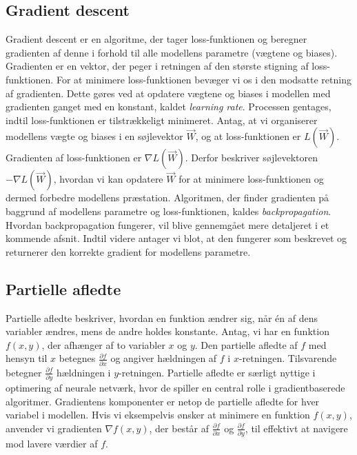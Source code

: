 \documentclass{article}
\begin{document}
\subsection{Gradient descent}
Gradient descent er en algoritme, der tager loss-funktionen og beregner gradienten af denne i forhold til alle modellens parametre (vægtene og biases). Gradienten er en vektor, der peger i retningen af den største stigning af loss-funktionen. For at minimere loss-funktionen bevæger vi os i den modsatte retning af gradienten. Dette gøres ved at opdatere vægtene og biases i modellen med gradienten ganget med en konstant, kaldet \textit{learning rate}. Processen gentages, indtil loss-funktionen er tilstrækkeligt minimeret. \parencite{IBM_2021, Sanderson_2017, Nielsen_2019a} Antag, at vi organiserer modellens vægte og biases i en søjlevektor $\vec{W}$, og at loss-funktionen er $L(\vec{W})$. Gradienten af loss-funktionen er $\nabla L(\vec{W})$. Derfor beskriver søjlevektoren $-\nabla L(\vec{W})$, hvordan vi kan opdatere $\vec{W}$ for at minimere loss-funktionen og dermed forbedre modellens præstation. Algoritmen, der finder gradienten på baggrund af modellens parametre og loss-funktionen, kaldes \textit{backpropagation}. \parencite{Sanderson_2017, Nielsen_2019a} Hvordan backpropagation fungerer, vil blive gennemgået mere detaljeret i et kommende afsnit. Indtil videre antager vi blot, at den fungerer som beskrevet og returnerer den korrekte gradient for modellens parametre.

\subsection{Partielle afledte}
Partielle afledte beskriver, hvordan en funktion ændrer sig, når én af dens variabler ændres, mens de andre holdes konstante. Antag, vi har en funktion $f(x, y)$, der afhænger af to variabler $x$ og $y$. Den partielle afledte af $f$ med hensyn til $x$ betegnes $\frac{\partial f}{\partial x}$ og angiver hældningen af $f$ i $x$-retningen. Tilsvarende betegner $\frac{\partial f}{\partial y}$ hældningen i $y$-retningen. Partielle afledte er særligt nyttige i optimering af neurale netværk, hvor de spiller en central rolle i gradientbaserede algoritmer. Gradientens komponenter er netop de partielle afledte for hver variabel i modellen. Hvis vi eksempelvis ønsker at minimere en funktion $f(x, y)$, anvender vi gradienten $\nabla f(x, y)$, der består af $\frac{\partial f}{\partial x}$ og $\frac{\partial f}{\partial y}$, til effektivt at navigere mod lavere værdier af $f$. \parencite{Kirsanov_2024}
\end{document}
